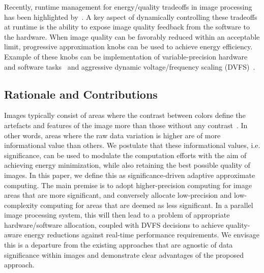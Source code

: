 \documentclass[journal]{IEEEtran}
\begin{document}
Recently, runtime management for energy\slash quality tradeoffs in image processing has been highlighted by~\cite{sampson2011enerj,Massimo2017}. A key aspect of dynamically controlling these tradeoffs at runtime is the ability to expose image quality feedback from the software to the hardware. When image quality can be favorably reduced within an acceptable limit, progressive approximation knobs can be used to achieve energy efficiency. Example of these knobs can be implementation of variable-precision hardware and software tasks~\cite{Massimo2017} and aggressive dynamic voltage\slash frequency scaling (DVFS)~\cite{yang2015adaptive}. 


\subsection{Rationale and Contributions}

Images typically consist of areas where the contrast between colors define the artefacts and features of the image more than those without any contrast~\cite{preston1988need}. In other words, areas where the raw data variation is higher are of more informational value than others. We postulate that these informational values, i.e. significance, can be used to modulate the computation efforts with the aim of achieving energy minimization, while also retaining the best possible quality of images. In this paper, we define this as significance-driven adaptive approximate computing. The main premise is to adopt higher-precision computing for image areas that are more significant, and conversely allocate low-precision and low-complexity computing for areas that are deemed as less significant. In a parallel image processing system, this will then lead to a problem of appropriate hardware\slash software allocation, coupled with DVFS decisions to achieve quality-aware energy reductions against real-time performance requirements. We envisage this is a departure from the existing approaches that are agnostic of data significance within images and demonstrate clear advantages of the proposed approach.
\end{document}
